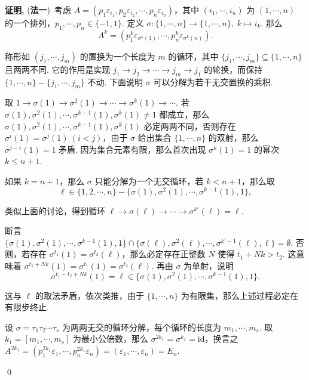 \documentclass[10pt,openany]{article}
\theoremstyle{thmstyle} %
\theoremstyle{defstyle} %
\theoremstyle{prostyle} %
\theoremstyle{exastyle}
\theoremstyle{remstyle}
\renewenvironment{proof}[1][证明]{\par\underline{\textbf{#1.}} \;\fangsong}{\qed\par}
\begin{document}
\begin{proof}
	(\textbf{法一})\ 考虑 \( A=(p_1\varepsilon_{i_1}, p_2 \varepsilon_{i_2},\cdots, p_n \varepsilon_{i_n}) \)，其中 \( (i_1,\cdots,i_n) \) 为 \( (1,\cdots,n) \) 的一个排列，\( p_1,\cdots,p_n \in \{-1,1\} \). 定义 \( \sigma: \{1,\cdots,n\} \to \{1,\cdots,n\}, \; k \mapsto i_k \). 那么 
	\[ A^k=(p_1^k \varepsilon_{\sigma^k(1)}, \cdots, p_n^k \varepsilon_{\sigma^k(n)}). \]
	
	称形如 \( (j_1,\cdots,j_m) \) 的置换为一个长度为 \( m \) 的循环，其中 \( \{j_1,\cdots,j_m\} \subseteq \{1,\cdots,n\} \) 且两两不同. 它的作用是实现 \( j_1 \to j_2 \to \cdots \to j_m \to j_1 \) 的轮换，而保持 \( \{1,\cdots,n\}-\{j_1,\cdots,j_m\} \) 不动. 下面说明 \( \sigma \) 可以分解为若干无交置换的乘积. 
	
	取 \( 1 \to \sigma(1) \to \sigma^2(1) \to \cdots \to \sigma^k(1) \to \cdots \). 若 \( \sigma(1),\sigma^2(1),\cdots,\sigma^{k-1}(1),\sigma^k(1) \neq 1 \) 都成立，那么 \( \sigma(1),\sigma^2(1),\cdots,\sigma^{k-1}(1),\sigma^k(1) \) 必定两两不同，否则存在 \( \sigma^i(1)=\sigma^j(1) \ (i<j) \)，由于 \( \sigma \) 给出集合 \( \{1,\cdots,n\} \) 的双射，那么 \( \sigma^{j-i}(1)=1 \) 矛盾. 因为集合元素有限，那么首次出现 \( \sigma^k(1)=1 \) 的幂次 \( k \leq n+1 \). 
	
	如果 \( k=n+1 \)，那么 \(  \sigma \) 只能分解为一个无交循环，若 \( k<n+1 \)，那么取 
	\[ \ell \in \{1,2,\cdots,n\}-\{ \sigma(1),\sigma^2(1),\cdots,\sigma^{k-1}(1),1 \}, \]
	
	类似上面的讨论，得到循环 \( \ell \to \sigma(\ell) \to \cdots \to \sigma^{k'}(\ell)=\ell \). 
	
	断言 \( \{\sigma(1),\sigma^2(1),\cdots,\sigma^{k-1}(1),1 \} \cap \{ \sigma(\ell),\sigma^2(\ell),\cdots,\sigma^{k'-1}(\ell),\ell \}= \emptyset \). 否则，若存在 \( \sigma^{t_1}(1)=\sigma^{t_2}(\ell) \)，那么必定存在正整数 \( N \) 使得 \( t_1+Nk>t_2 \). 这意味着 \(  \sigma^{t_1+Nk}(1)=\sigma^{t_1}(1)=\sigma^{t_2}(\ell) \). 再由 \( \sigma \) 为单射，说明 
	\[ \sigma^{t_1-t_2+Nk}(1)=\ell \in \{ \sigma(1),\sigma^2(1),\cdots,\sigma^{k-1}(1),1 \}. \] 
	
	这与 \( \ell \) 的取法矛盾，依次类推，由于 \( \{1,\cdots,n\} \) 为有限集，那么上述过程必定在有限步终止. 
	
	设 \( \sigma=\tau_1\tau_2 \cdots \tau_s \) 为两两无交的循环分解，每个循环的长度为 \( m_1,\cdots,m_s \). 取 \( k_1=[m_1,\cdots,m_s] \) 为最小公倍数，那么 \( \sigma^{2k_1}=\sigma^{k_1}=\mathrm{id} \)，换言之 \( A^{2k_1}=(p_1^{2k_1}\varepsilon_1,\cdots,p_n^{2k_1}\varepsilon_n)=(\varepsilon_1,\cdots,\varepsilon_n)=E_n \).
	

\end{proof}
\end{document}
